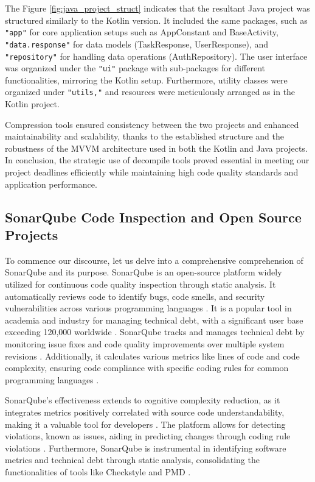 \par
The Figure \ref{fig:java_project_struct} indicates that the resultant Java project was structured similarly to the Kotlin version. It included the same packages, such as \verb|"app"| for core application setups such as AppConstant and BaseActivity, \verb|"data.response"| for data models (TaskResponse, UserResponse), and \verb|"repository"| for handling data operations (AuthRepository). The user interface was organized under the \verb|"ui"| package with sub-packages for different functionalities, mirroring the Kotlin setup. Furthermore, utility classes were organized under \verb|"utils,"| and resources were meticulously arranged as in the Kotlin project.
\par
Compression tools ensured consistency between the two projects and enhanced maintainability and scalability, thanks to the established structure and the robustness of the MVVM architecture used in both the Kotlin and Java projects. In conclusion, the strategic use of decompile tools proved essential in meeting our project deadlines efficiently while maintaining high code quality standards and application performance.
\subsection{SonarQube Code Inspection and Open Source Projects}
To commence our discourse, let us delve into a comprehensive comprehension of SonarQube and its purpose. SonarQube is an open-source platform widely utilized for continuous code quality inspection through static analysis. It automatically reviews code to identify bugs, code smells, and security vulnerabilities across various programming languages \cite{hegedHus2022static}. It is a popular tool in academia and industry for managing technical debt, with a significant user base exceeding 120,000 worldwide \cite{lenarduzzi2019technical}. SonarQube tracks and manages technical debt by monitoring issue fixes and code quality improvements over multiple system revisions \cite{tan2021evolution}. Additionally, it calculates various metrics like lines of code and code complexity, ensuring code compliance with specific coding rules for common programming languages \cite{kawuma2022empirical}.
\par
SonarQube's effectiveness extends to cognitive complexity reduction, as it integrates metrics positively correlated with source code understandability, making it a valuable tool for developers \cite{saborido2022automatizing}. The platform allows for detecting violations, known as issues, aiding in predicting changes through coding rule violations \cite{tollin2017change}. Furthermore, SonarQube is instrumental in identifying software metrics and technical debt through static analysis, consolidating the functionalities of tools like Checkstyle and PMD \cite{guamansonarqube}.
